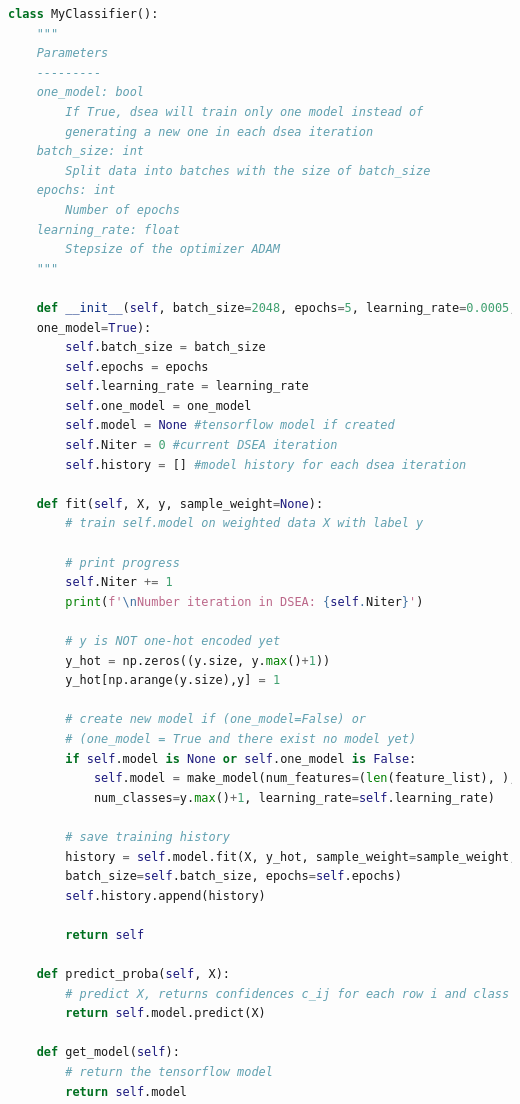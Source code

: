 \newpage
\begin{lstlisting}[language=Python, basicstyle=\small, captionpos=b, caption=Quellcode des Wrappers zur Verwendung der Keras-API\cite{tensorflow2015-whitepaper} in DSEA. Es wird die Funktion \textbf{make\_model} im Anhang \ref{code:model} zur Erstellung der Tensorflow-Modelle benötigt., label=code:wrapper]
class MyClassifier():
    """
    Parameters
    ---------
    one_model: bool
        If True, dsea will train only one model instead of 
        generating a new one in each dsea iteration
    batch_size: int
        Split data into batches with the size of batch_size
    epochs: int
        Number of epochs
    learning_rate: float
        Stepsize of the optimizer ADAM
    """

    def __init__(self, batch_size=2048, epochs=5, learning_rate=0.0005,
    one_model=True):        
        self.batch_size = batch_size
        self.epochs = epochs
        self.learning_rate = learning_rate
        self.one_model = one_model
        self.model = None #tensorflow model if created
        self.Niter = 0 #current DSEA iteration
        self.history = [] #model history for each dsea iteration

    def fit(self, X, y, sample_weight=None):
        # train self.model on weighted data X with label y

        # print progress
        self.Niter += 1
        print(f'\nNumber iteration in DSEA: {self.Niter}')

        # y is NOT one-hot encoded yet
        y_hot = np.zeros((y.size, y.max()+1))
        y_hot[np.arange(y.size),y] = 1
        
        # create new model if (one_model=False) or
        # (one_model = True and there exist no model yet)
        if self.model is None or self.one_model is False:
            self.model = make_model(num_features=(len(feature_list), ),
            num_classes=y.max()+1, learning_rate=self.learning_rate)

        # save training history
        history = self.model.fit(X, y_hot, sample_weight=sample_weight,
        batch_size=self.batch_size, epochs=self.epochs)
        self.history.append(history)

        return self

    def predict_proba(self, X):
        # predict X, returns confidences c_ij for each row i and class j
        return self.model.predict(X)

    def get_model(self):
        # return the tensorflow model
        return self.model


\end{lstlisting}
